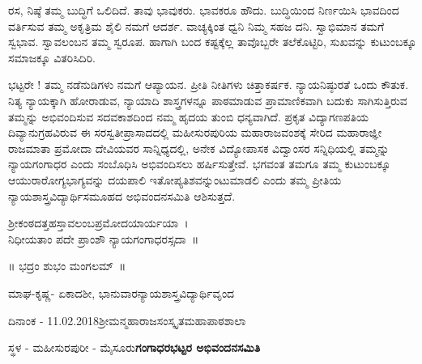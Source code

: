 {ರಸ, ನಿಷ್ಠೆ ತಮ್ಮ ಬುದ್ಧಿಗೆ ಒಲಿದಿದೆ. ತಾವು ಭಾವುಕರು. ಭಾವಕರೂ ಹೌದು. ಬುದ್ಧಿಯಿಂದ ನಿರ್ಣಯಿಸಿ ಭಾವದಿಂದ ವರ್ತಿಸುವ ತಮ್ಮ ಅಕೃತ್ರಿಮ ಶೈಲಿ ನಮಗೆ ಆದರ್ಶ. ವಾಚ್ಯಕ್ಕಿಂತ ಧ್ವನಿ ನಿಮ್ಮ ಸಹಜ ದನಿ.  ಸ್ವಾಭಿಮಾನ ತಮಗೆ ಸ್ವಭಾವ. ಸ್ವಾವಲಂಬನ ತಮ್ಮ ಸ್ವರೂಪ. ಹಾಗಾಗಿ ಬಂದ ಕಷ್ಟಕ್ಕೆಲ್ಲ ತಾವೊಬ್ಬರೇ ತಲೆಕೊಟ್ಟಿರಿ, ಸುಖವನ್ನು ಕುಟುಂಬಕ್ಕೂ ಸಮಾಜಕ್ಕೂ ವಿತರಿಸಿದಿರಿ.

ಭಟ್ಟರೇ ! ತಮ್ಮ ನಡೆನುಡಿಗಳು ನಮಗೆ ಆಪ್ಯಾಯನ. ಪ್ರೀತಿ ನೀತಿಗಳು ಚಿತ್ತಾಕರ್ಷಕ. ನ್ಯಾಯ\-ನಿಷ್ಠುರತೆ ಒಂದು ಕೌತುಕ.  ನಿತ್ಯ ನ್ಯಾಯಕ್ಕಾಗಿ ಹೋರಾಡುವ, ನ್ಯಾಯಾದಿ ಶಾಸ್ತ್ರಗಳನ್ನೂ ಪಾಠ\-ಮಾಡುವ ಪ್ರಾಮಾಣಿಕವಾಗಿ ಬದುಕು ಸಾಗಿಸುತ್ತಿರುವ ತಮ್ಮನ್ನು ಅಭಿವಂದಿಸುವ ಸದವಕಾಶದಿಂದ ನಮ್ಮ ಹೃದಯ ತುಂಬಿ ಧನ್ಯವಾಗಿದೆ. ಪ್ರಕೃತ ವಿದ್ಯಾಗಣಪತಿಯ ದಿವ್ಯಾನುಗ್ರಹವಿರುವ ಈ ಸರಸ್ವತೀಪ್ರಾಸಾದದಲ್ಲಿ ಮಹೀಸುರಪುರಿಯ ಮಹಾರಾಜವಂಶಕ್ಕೆ ಸೇರಿದ ಮಹಾರಾಜ್ಞೀ ರಾಜಮಾತಾ ಪ್ರಮೋದಾ ದೇವಿಯವರ ಸಾನ್ನಿಧ್ಯದಲ್ಲಿ, ಅನೇಕ ವಿದ್ಯೋಪಾಸಕ ವಿದ್ವಾಂಸರ ಸನ್ನಿಧಿಯಲ್ಲಿ ತಮ್ಮನ್ನು ನ್ಯಾಯ\-ಗಂಗಾಧರ ಎಂದು ಸಂಬೊಧಿಸಿ ಅಭಿವಂದಿಸಲು ಹರ್ಷಿಸುತ್ತೇವೆ. ಭಗವಂತ ತಮಗೂ ತಮ್ಮ ಕುಟುಂಬಕ್ಕೂ ಆಯುರಾರೋಗ್ಯಭಾಗ್ಯವನ್ನು ದಯಪಾಲಿ ಇತೋಪ್ಯತಿಶವನ್ನುಂಟುಮಾಡಲಿ ಎಂದು ತಮ್ಮ ಪ್ರೀತಿಯ ನ್ಯಾಯಶಾಸ್ತ್ರವಿದ್ಯಾರ್ಥಿಸಮೂಹದ ಅಭಿವಂದನಸಮಿತಿ ಆಶಿಸುತ್ತದೆ.

\begin{center}
ಶ್ರೀಕಂಠದತ್ತಹಸ್ತಾವಲಂಬಪ್ರಮೋದಯಾರ್ಯಯಾ~।\\
ನಿಧೀಯತಾಂ ಪದೇ ಪ್ರಾಂಶೌ ನ್ಯಾಯಗಂಗಾಧರಸ್ಸದಾ~॥
\end{center}

\centerline{॥ ಭದ್ರಂ ಶುಭಂ ಮಂಗಲಮ್~॥}
\bigskip

ಮಾಘ-ಕೃಷ್ಣ- ಏಕಾದಶೀ, ಭಾನುವಾರ\hfill				           ನ್ಯಾಯಶಾಸ್ತ್ರವಿದ್ಯಾರ್ಥಿವೃಂದ

ದಿನಾಂಕ - 11.02.2018\hfill  						     ಶ್ರೀಮನ್ಮಹಾರಾಜಸಂಸ್ಕೃತಮಹಾಪಾಠಶಾಲಾ

ಸ್ಥಳ - ಮಹೀಸುರಪುರೀ - ಮೈಸೂರು\hfill				        \textbf{ಗಂಗಾಧರಭಟ್ಟರ ಅಭಿವಂದನಸಮಿತಿ}
}
